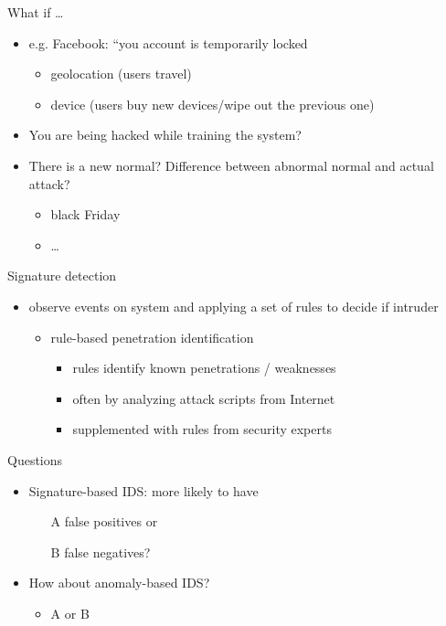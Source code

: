 \documentclass{beamer}
\begin{document}
\begin{frame}{What if \dots}
  \begin{itemize}
  \item e.g. Facebook: ``you account is temporarily locked
    \begin{itemize}
      \item geolocation (users travel)
      \item device (users buy new devices/wipe out the previous one)
    \end{itemize}
  \item You are being hacked while training the 
    system? 
  \item There is a new normal? Difference between 
    abnormal normal and actual attack?
    \begin{itemize}
      \item black Friday
      \item \dots
    \end{itemize}
  \end{itemize}
\end{frame}

\begin{frame}{Signature detection}
  \begin{itemize}
  \item observe events on system and applying a set of 
    rules to decide if intruder 
    \begin{itemize}
    \item rule-based penetration identification 
      \begin{itemize}
      \item rules identify known penetrations / weaknesses 
      \item often by analyzing attack scripts from Internet 
      \item supplemented with rules from security experts 
      \end{itemize}
    \end{itemize}
  \end{itemize}
\end{frame}

\begin{frame}{Questions}
  \begin{itemize}
  \item Signature-based IDS: more likely to have 
    \begin{itemize}
    \item[A] false positives or 
    \item[B] false negatives? 
    \end{itemize}
  \item How about anomaly-based IDS? 
    \begin{itemize}
      \item A or B 
    \end{itemize}
  \end{itemize}
\end{frame}
\end{document}
